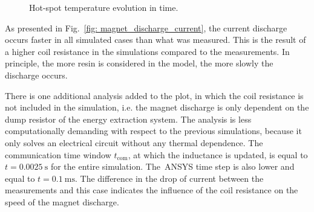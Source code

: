 \begin{figure}[H]
    \centering
    \caption{Hot-spot temperature evolution in time.}
    \label{fig: magnet_discharge_hot_spot}
\end{figure}

As presented in Fig.~\ref{fig: magnet_discharge_current}, the current discharge occurs faster in all simulated cases than what was measured. This is the result of a higher coil resistance in the simulations compared to the measurements. In principle, the more resin is considered in the model, the more slowly the discharge occurs. 

There is one additional analysis added to the plot, in which the coil resistance is not included in the simulation, i.e. the magnet discharge is only dependent on the dump resistor of the energy extraction system. The analysis is less computationally demanding with respect to the previous simulations, because it only solves an electrical circuit without any thermal dependence. The communication time window $t_\text{com}$, at which the inductance is updated, is equal to $t=0.0025~\text{s}$ for the entire simulation. The~ANSYS time step is also lower and equal to $t=0.1~\text{ms}$. The difference in the drop of current between the measurements and this case indicates the influence of the coil resistance on the speed of the magnet discharge.


